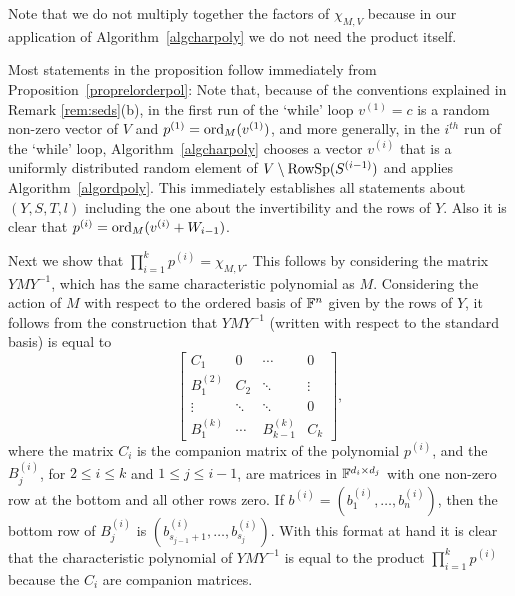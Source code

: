 \begin{Rem}
Note that we do not multiply together the factors of 
$\chi_{M,V}$ because in our application of Algorithm~\ref{algcharpoly} 
we do not need the product itself.
\end{Rem}

Most statements in the proposition follow immediately from 
Proposition~\ref{proprelorderpol}: Note that, because of the conventions
explained in Remark \ref{rem:seds}(b), in the first run of the
`while' loop $v^{(1)}=c$ is a random non-zero vector of $V$ and
$p^{(1)}=\mathrm{ord}_M(v^{(1)})$, and more generally,
in the $i^{th}$ run of the 
`while' loop, Algorithm~\ref{algcharpoly}
chooses a  vector $v^{(i)}$ that is a uniformly distributed random element 
of $V\setminus \mathrm{RowSp}(S^{(i-1)})$
and applies Algorithm~\ref{algordpoly}.
This immediately establishes all statements about
$(Y,S,T,l)$ including the one about the invertibility and the
rows of $Y$. Also it is clear that $p^{(i)} = \mathrm{ord}_M(v^{(i)} + W_{i-1})$.

Next we show that $\prod_{i=1}^k p^{(i)} = \chi_{M,V}$. 
This follows by considering
the matrix $YMY^{-1}$, which has the same characteristic polynomial
as $M$. Considering the action of $M$ with respect to the 
ordered basis of $\mathbb{F}^n$ given by the rows of $Y$, it follows from
the construction that $YMY^{-1}$ 
(written with respect to the standard basis) is equal to
\[ \left[\begin{array}{cccc}
 C_1       &   0  & \cdots & 0 \\
 B^{(2)}_1 &  C_2 & \ddots & \vdots \\
 \vdots    &\ddots& \ddots & 0 \\
 B^{(k)}_1 &\cdots& B^{(k)}_{k-1} & C_k
\end{array} \right], \]
where the matrix $C_i$ is the companion matrix of the polynomial $p^{(i)}$,
and the $B^{(i)}_j$, for $2 \le i \le k$ and $1 \le j \le i-1$, are matrices
in $\mathbb{F}^{d_i \times d_j}$
with one non-zero row at the bottom and all other rows zero.
If $b^{(i)} = (b^{(i)}_1,\dots,b^{(i)}_n)$, then the bottom row of 
$B^{(i)}_j$ is $(b^{(i)}_{s_{j-1}+1},\dots,b^{(i)}_{s_j})$.
With this format at hand it is clear that the characteristic polynomial
of $YMY^{-1}$ is equal to the product $\prod_{i=1}^k p^{(i)}$ because
the $C_i$ are companion matrices.

